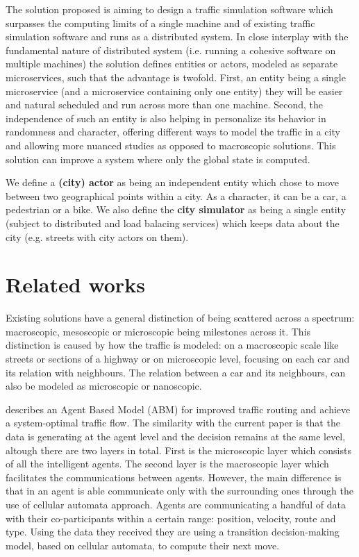 \documentclass[conference]{IEEEtran}
\begin{document}
The solution proposed is aiming to design a traffic simulation software which surpasses the computing limits of a single machine and of existing traffic simulation software and runs as a distributed system. In close interplay with the fundamental nature of distributed system (i.e. running a cohesive software on multiple machines) the solution defines entities or actors, modeled as separate microservices, such that the advantage is twofold. First, an entity being a single microservice (and a microservice containing only one entity) they will be easier and natural scheduled and run across more than one machine. Second, the independence of such an entity is also helping in personalize its behavior in randomness and character, offering different ways to model the traffic in a city and allowing more nuanced studies as opposed to macroscopic solutions. This solution can improve a system where only the global state is computed.

We define a \textbf{(city) actor} as being an independent entity which chose to move between two geographical points within a city. As a character, it can be a car, a pedestrian or a bike. We also define the \textbf{city simulator} as being a single entity (subject to distributed and load balacing services) which keeps data about the city (e.g. streets with city actors on them).

\section{Related works}
\label{sec:existingsolutions}

Existing solutions have a general distinction of being scattered across a spectrum: macroscopic, mesoscopic or microscopic being milestones across it. This distinction is caused by how the traffic is modeled: on a macroscopic scale like streets or sections of a highway or on microscopic level, focusing on each car and its relation with neighbours. The relation between a car and its neighbours, can also be modeled as microscopic or nanoscopic.

\cite{abm-for-traffic-routing} describes an Agent Based Model (ABM) for improved traffic routing and achieve a system-optimal traffic flow. The similarity with the current paper is that the data is generating at the agent level and the decision remains at the same level, altough there are two layers in total. First is the microscopic layer which consists of all the intelligent agents. The second layer is the macroscopic layer which facilitates the communications between agents. However, the main difference is that in \cite{abm-for-traffic-routing} an agent is able communicate only with the surrounding ones through the use of cellular automata approach. Agents are communicating a handful of data with their co-participants within a certain range: position, velocity, route and type. Using the data they received they are using a transition decision-making model, based on cellular automata, to compute their next move.
\end{document}
